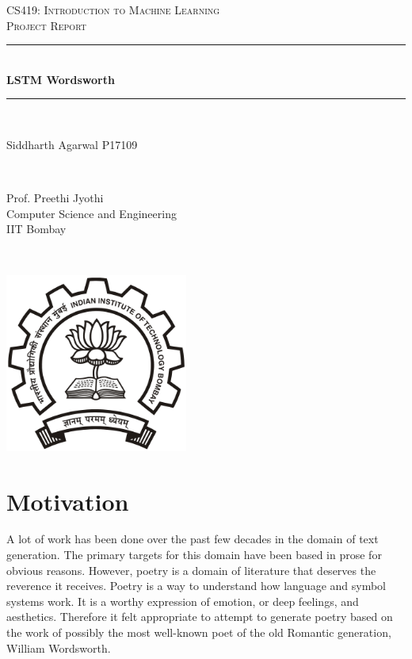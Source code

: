 \documentclass[15pt]{article}
\newcommand{\HRule}{\rule{\linewidth}{0.5mm}}
\begin{document}
\begin{center}
\textsc{\LARGE CS419: Introduction to Machine Learning}\\[1.0cm]
\textsc{\Large Project Report}

\HRule \\[0.4cm]
{ \huge \bfseries LSTM Wordsworth}\\[0.15cm] 
\HRule \\[1.5cm]
\end{center}

\begin{minipage}{0.5\textwidth}
\begin{flushleft} \large
Siddharth Agarwal P17109 
\end{flushleft}
\end{minipage}
~
\begin{minipage}{0.4\textwidth}
\begin{flushright} \large
Prof. Preethi Jyothi \\
Computer Science and Engineering\\
IIT Bombay

\end{flushright}
\end{minipage}\\[2cm]

\begin{center}
\includegraphics[width=60mm]{IIT_Bombay_logo.png}
\end{center}

\bigskip

\newpage
\tableofcontents
\newpage

\section{Motivation}
A lot of work has been done over the past few decades in the domain of text generation. The primary targets for this domain have been based in prose for obvious reasons.  However, poetry is a domain of literature that deserves the reverence it receives. Poetry is a way to understand how language and symbol systems work. It is a worthy expression of emotion, or deep feelings, and aesthetics. Therefore it felt appropriate to attempt to generate poetry based on the work of possibly the most well-known poet of the old Romantic generation, William Wordsworth.
\end{document}
